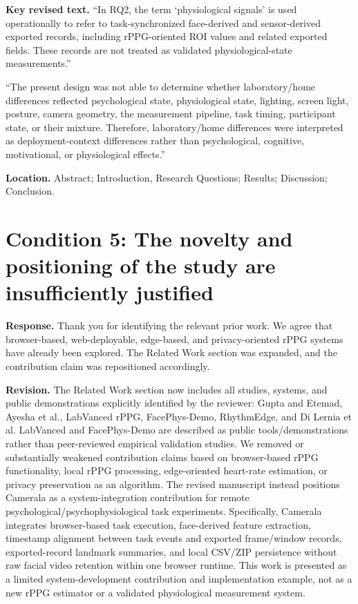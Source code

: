 \documentclass[11pt]{article}
\newcommand{\condition}[2]{\section*{Condition #1: #2}}
\begin{document}
\textbf{Key revised text.}
``In RQ2, the term `physiological signals' is used operationally to refer to task-synchronized face-derived and sensor-derived exported records, including rPPG-oriented ROI values and related exported fields. These records are not treated as validated physiological-state measurements.''

``The present design was not able to determine whether laboratory/home differences reflected psychological state, physiological state, lighting, screen light, posture, camera geometry, the measurement pipeline, task timing, participant state, or their mixture. Therefore, laboratory/home differences were interpreted as deployment-context differences rather than psychological, cognitive, motivational, or physiological effects.''

\textbf{Location.}
Abstract; Introduction, Research Questions; Results; Discussion; Conclusion.

\condition{5}{The novelty and positioning of the study are insufficiently justified}
\textbf{Response.}
Thank you for identifying the relevant prior work.
We agree that browser-based, web-deployable, edge-based, and privacy-oriented rPPG systems have already been explored.
The Related Work section was expanded, and the contribution claim was repositioned accordingly.

\textbf{Revision.}
The Related Work section now includes all studies, systems, and public demonstrations explicitly identified by the reviewer: Gupta and Etemad, Ayesha et al., LabVanced rPPG, FacePhys-Demo, RhythmEdge, and Di Lernia et al.
LabVanced and FacePhys-Demo are described as public tools/demonstrations rather than peer-reviewed empirical validation studies.
We removed or substantially weakened contribution claims based on browser-based rPPG functionality, local rPPG processing, edge-oriented heart-rate estimation, or privacy preservation as an algorithm.
The revised manuscript instead positions Camerala as a system-integration contribution for remote psychological/psychophysiological task experiments.
Specifically, Camerala integrates browser-based task execution, face-derived feature extraction, timestamp alignment between task events and exported frame/window records, exported-record landmark summaries, and local CSV/ZIP persistence without raw facial video retention within one browser runtime.
This work is presented as a limited system-development contribution and implementation example, not as a new rPPG estimator or a validated physiological measurement system.
\end{document}
